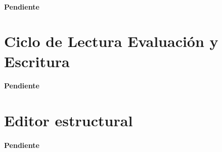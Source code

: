 \documentclass[letterpaper,twoside,openright,11pt]{book}
\begin{document}
\paragraph{Pendiente}

\nwenddocs{}\section*{Ciclo de Lectura Evaluación y Escritura}

\paragraph{Pendiente}

\nwenddocs{}\section*{Editor estructural}

\paragraph{Pendiente}

\nwenddocs{}
\end{document}
